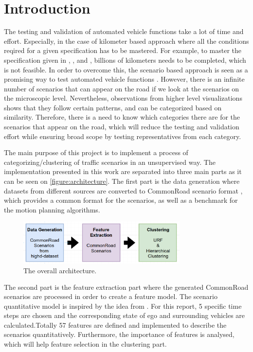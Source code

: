 \documentclass[conference]{IEEEtran}
\begin{document}
\section{Introduction}
\IEEEPARstart
The testing and validation of automated vehicle functions take a lot of time and effort. Especially, in the case of kilometer based approach where all the conditions reqired for a given specification has to be mastered. For example, to master the specification given in \cite{shalev2017formal}, \cite{zhao2017lab}, and \cite{matthaeia2015autonomous}, billions of kilometers needs to be completed, which is not feasible. In order to overcome this, the scenario based approach is seen as a promising way to test automated vehicle functions \cite{pegasus}. However, there is an infinite number of scenarios that can appear on the road if we look at the scenarios on the microscopic level. Nevertheless, observations from higher level visualizations shows that they follow certain patterns, and can be categorized based on similarity. Therefore, there is a need to know which categories there are for the scenarios that appear on the road, which will reduce the testing and validation effort while ensuring broad scope by testing representatives from each category.

The main purpose of this project is to implement a process of categorizing/clustering of traffic scenarios in an unsupervised way. The implementation presented in this work are separated into three main parts as it can be seen on \autoref{figure:architecture}. The first part is the data generation where datasets from different sources are converted to CommonRoad scenario format \cite{althoff2017commonroad}, which provides a common format for the scenarios, as well as a benchmark for the motion planning algorithms.

\begin{figure}[!h]
  \begin{center}
  	\includegraphics[width=8.5cm,height=2.3cm]{./images/proposed}
  \end{center}
  \caption{The overall architecture.}
  \label{figure:architecture}
\end{figure}

The second part is the feature extraction part where the generated CommonRoad scenarios are processed in order to create a feature model. The scenario quantitative model is inspired by the idea from \cite{Kruber2019UnsupervisedAS}. For this report, 5 specific time steps are chosen and the corresponding state of ego and surrounding vehicles are calculated.Totally 57 features are defined and implemented to describe the scenarios quantitatively. Furthermore, the importance of features is analysed, which will help feature selection in the clustering part.
\end{document}
